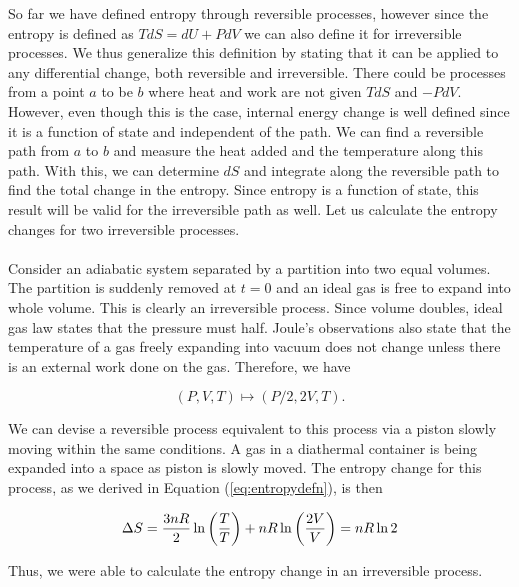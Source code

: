         So far we have defined entropy through reversible processes, however since the entropy is defined as $TdS = dU + PdV$ we can also define it for irreversible processes. We thus generalize this definition by stating that it can be applied to any differential change, both reversible and irreversible. There could be processes from a point $a$ to be $b$ where heat and work are not given $TdS$ and $-PdV$. However, even though this is the case, internal energy change is well defined since it is a function of state and independent of the path. We can find a reversible path from $a$ to $b$ and measure the heat added and the temperature along this path. With this, we can determine $dS$ and integrate along the reversible path to find the total change in the entropy. Since entropy is a function of state, this result will be valid for the irreversible path as well. Let us calculate the entropy changes for two irreversible processes. \\
        \\
        Consider an adiabatic system separated by a partition into two equal volumes. The partition is suddenly removed at $t=0$ and an ideal gas is free to expand into whole volume. This is clearly an irreversible process. Since volume doubles, ideal gas law states that the pressure must half. Joule's observations also state that the temperature of a gas freely expanding into vacuum does not change unless there is an external work done on the gas. Therefore, we have
        
        \begin{equation*}
            (P,V,T) \longmapsto (P/2, 2V, T).
        \end{equation*}
        
        We can devise a reversible process equivalent to this process via a piston slowly moving within the same conditions. A gas in a diathermal container is being expanded into a space as piston is slowly moved. The entropy change for this process, as we derived in Equation (\ref{eq:entropydefn}), is then
        
        \begin{equation}
            \Delta S = \frac{3nR}{2}\ln\left( \frac{T}{T} \right) + nR\ln\left( \frac{2V}{V} \right) = nR\ln2
        \end{equation}
        
        Thus, we were able to calculate the entropy change in an irreversible process. 
        
